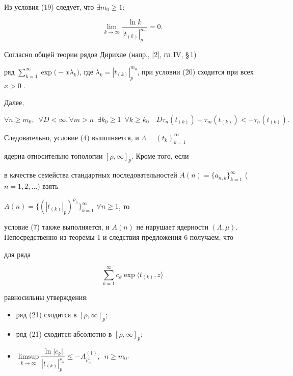 Из условия (19) следует, что $\exists m_0\geqslant 1$:


\begin{equation}


\lim\limits_{k\to\infty}\dfrac{\ln k}{|t_{(k)}|_p^{m_0}}=0.


\end{equation}


Согласно общей теории рядов Дирихле (напр., [2], гл.\,IV, \S\,1)


ряд $\sum\limits_{k=1}^{\infty}\exp\bigl(-x\lambda_k)$, где $\lambda_k=


|t_{(k)}|_p^{m_0}$, при условии (20) сходится при всех $x>0$ .





Далее, 


$$


\forall n\geqslant m_0,\; \ \forall D<\infty, \forall m>n\ \;


\exists k_0\geqslant 1\ \; \forall k\geqslant k_0\quad


D\tau_n(t_{(k)})-\tau_m(t_{(k)})<-\tau_n(t_{(k)}).


$$


Следовательно, условие (4) выполняется, и $\Lambda=(t_k)_{k=1}^{\infty}$


ядерна относительно топологии $[\rho,\infty]_p$. Кроме того, если


в качестве семейства стандартных последовательностей $A(n)=\{


a_{n,k}\}_{k=1}^{\infty}$ ($n=1,2,\dotsc$) взять 


$A(n)=\{(|t_{(k)}|_p)^{\rho_n}\}_{k=1}^{\infty}$ $\forall n\geqslant 1$, то


условие (7) также выполняется, и $A(n)$ не нарушает ядерности $(\Lambda,


\mu)$. Непосредственно из теоремы 1 и следствия предложения 6 получаем, что


для ряда


\begin{equation}


\sum\limits_{k=1}^{\infty}c_k\exp\langle t_{(k)},z\rangle


\end{equation}


равносильны утверждения:


\begin{itemize}


\item[1)] ряд (21) сходится в $[\rho,\infty]_p$;


\item[2)] ряд (21) сходится абсолютно в $[\rho,\infty]_p$;


\item[3)] $\limsup\limits_{k\to\infty}\dfrac{\ln|c_k|}{|t_{(k)}|_p^{\rho_n}}


\leqslant -A^{(1)}_{\rho_n^0}, \ \; n\geqslant m_0$.


\end{itemize}


